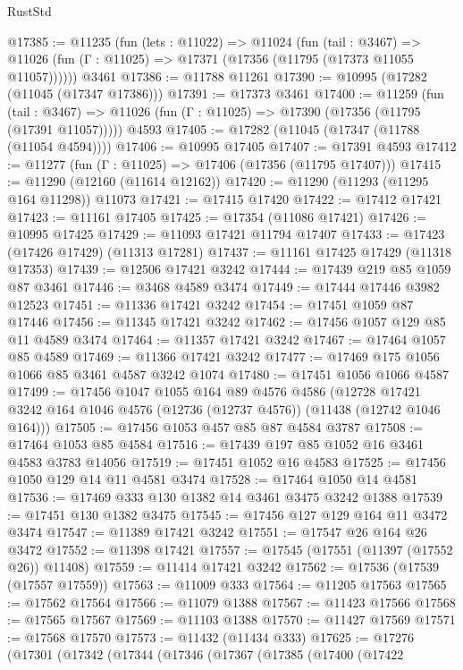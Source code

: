 \begin{lexlean}{RustStd}
\begin{coremodule}
@17385 := @11235
    (fun (lets : @11022) =>
    @11024
      (fun (tail : @3467) =>
      @11026 (fun (Γ : @11025) => @17371 (@17356 (@11795 (@17373 @11055 @11057))))))
    @3461
@17386 := @11788 @11261
@17390 := @10995 (@17282 (@11045 (@17347 @17386)))
@17391 := @17373 @3461
@17400 := @11259
    (fun (tail : @3467) => @11026 (fun (Γ : @11025) => @17390 (@17356 (@11795 (@17391 @11057)))))
    @4593
@17405 := @17282 (@11045 (@17347 (@11788 (@11054 @4594))))
@17406 := @10995 @17405
@17407 := @17391 @4593
@17412 := @11277 (fun (Γ : @11025) => @17406 (@17356 (@11795 @17407)))
@17415 := @11290 (@12160 (@11614 @12162))
@17420 := @11290 (@11293 (@11295 @164 @11298)) @11073
@17421 := @17415 @17420
@17422 := @17412 @17421
@17423 := @11161 @17405
@17425 := @17354 (@11086 @17421)
@17426 := @10995 @17425
@17429 := @11093 @17421 @11794 @17407
@17433 := @17423 (@17426 @17429) (@11313 @17281)
@17437 := @11161 @17425 @17429 (@11318 @17353)
@17439 := @12506 @17421 @3242
@17444 := @17439 @219 @85 @1059 @87 @3461
@17446 := @3468 @4589 @3474
@17449 := @17444 @17446 @3982 @12523
@17451 := @11336 @17421 @3242
@17454 := @17451 @1059 @87 @17446
@17456 := @11345 @17421 @3242
@17462 := @17456 @1057 @129 @85 @11 @4589 @3474
@17464 := @11357 @17421 @3242
@17467 := @17464 @1057 @85 @4589
@17469 := @11366 @17421 @3242
@17477 := @17469 @175 @1056 @1066 @85 @3461 @4587 @3242 @1074
@17480 := @17451 @1056 @1066 @4587
@17499 := @17456
    @1047
    @1055
    @164
    @89
    @4576
    @4586
    (@12728 @17421 @3242 @164 @1046 @4576 (@12736 (@12737 @4576)) (@11438 (@12742 @1046 @164)))
@17505 := @17456 @1053 @457 @85 @87 @4584 @3787
@17508 := @17464 @1053 @85 @4584
@17516 := @17439 @197 @85 @1052 @16 @3461 @4583 @3783 @14056
@17519 := @17451 @1052 @16 @4583
@17525 := @17456 @1050 @129 @14 @11 @4581 @3474
@17528 := @17464 @1050 @14 @4581
@17536 := @17469 @333 @130 @1382 @14 @3461 @3475 @3242 @1388
@17539 := @17451 @130 @1382 @3475
@17545 := @17456 @127 @129 @164 @11 @3472 @3474
@17547 := @11389 @17421 @3242
@17551 := @17547 @26 @164 @26 @3472
@17552 := @11398 @17421
@17557 := @17545 (@17551 (@11397 (@17552 @26)) @11408)
@17559 := @11414 @17421 @3242
@17562 := @17536 (@17539 (@17557 @17559))
@17563 := @11009 @333
@17564 := @11205 @17563
@17565 := @17562 @17564
@17566 := @11079 @1388
@17567 := @11423 @17566
@17568 := @17565 @17567
@17569 := @11103 @1388
@17570 := @11427 @17569
@17571 := @17568 @17570
@17573 := @11432 (@11434 @333)
@17625 := @17276
    (@17301
      (@17342
        (@17344
          (@17346
            (@17367
              (@17385
                (@17400
                  (@17422

\end{coremodule}
\end{lexlean}
